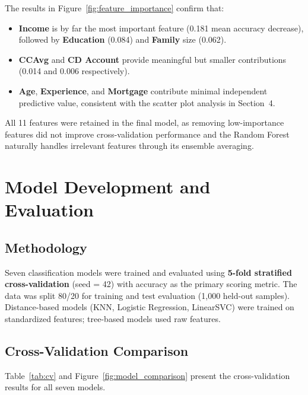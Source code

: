\documentclass[11pt, a4paper]{article}
\begin{document}
The results in Figure~\ref{fig:feature_importance} confirm that:
\begin{itemize}[itemsep=2pt]
    \item \textbf{Income} is by far the most important feature (0.181 mean
          accuracy decrease), followed by \textbf{Education} (0.084) and
          \textbf{Family} size (0.062).
    \item \textbf{CCAvg} and \textbf{CD Account} provide meaningful but
          smaller contributions (0.014 and 0.006 respectively).
    \item \textbf{Age}, \textbf{Experience}, and \textbf{Mortgage} contribute
          minimal independent predictive value, consistent with the scatter
          plot analysis in Section~4.
\end{itemize}

All 11 features were retained in the final model, as removing low-importance
features did not improve cross-validation performance and the Random Forest
naturally handles irrelevant features through its ensemble averaging.

\section{Model Development and Evaluation}

\subsection{Methodology}

Seven classification models were trained and evaluated using \textbf{5-fold
stratified cross-validation} (seed = 42) with accuracy as the primary scoring
metric. The data was split 80/20 for training and test evaluation
(1{,}000 held-out samples). Distance-based models (KNN, Logistic Regression,
LinearSVC) were trained on standardized features; tree-based models used raw
features.

\subsection{Cross-Validation Comparison}

Table~\ref{tab:cv} and Figure~\ref{fig:model_comparison} present the
cross-validation results for all seven models.
\end{document}
